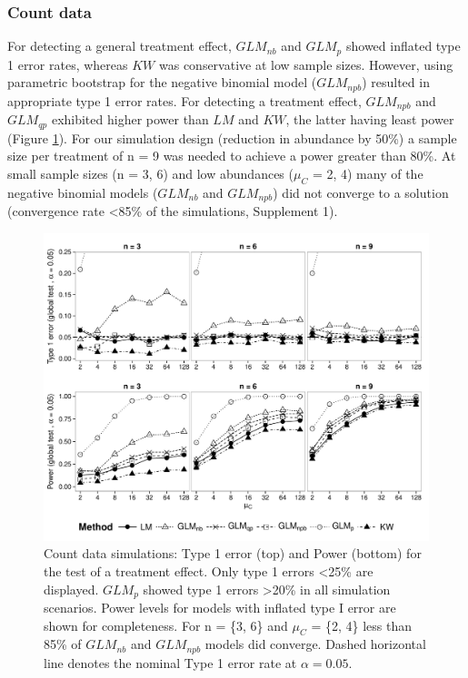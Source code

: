 \documentclass[twocolumn, natbib]{svjour3}
\begin{document}
\subsubsection{Count data}
For detecting a general treatment effect, $GLM_{nb}$ and $GLM_{p}$ showed inflated type 1 error rates, whereas $KW$ was conservative at low sample sizes.
However, using parametric bootstrap for the negative binomial model ($GLM_{npb}$) resulted in appropriate type 1 error rates.
For detecting a treatment effect, $GLM_{npb}$ and $GLM_{qp}$ exhibited higher power than $LM$ and $KW$, the latter having least power (Figure \ref{fig:p_glob_c}).
For our simulation design (reduction in abundance by 50\%) a sample size per treatment of n = 9 was needed to achieve a power greater than 80\%.
At small sample sizes (n = {3, 6}) and low abundances ($\mu_C$ = {2, 4}) many of the negative binomial models ($GLM_{nb}$ and $GLM_{npb}$) did not converge to a solution (convergence rate \textless 85\% of the simulations, Supplement 1). 

\begin{figure}
  \centering
  \includegraphics[width = 126mm]{p_glob_c.pdf}
  \caption{Count data simulations: Type 1 error (top) and Power (bottom) for the test of a treatment effect.
  Only type 1 errors \textless 25\% are displayed. 
  $GLM_p$ showed type 1 errors \textgreater 20\% in all simulation scenarios.
  Power levels for models with inflated type I error are shown for completeness.
  For n = \{3, 6\} and $\mu_C$ = \{2, 4\} less than 85\% of $GLM_{nb}$ and $GLM_{npb}$ models did converge.
  Dashed horizontal line denotes the nominal Type 1 error rate at $\alpha = 0.05$.
  }
  \label{fig:p_glob_c}
\end{figure}
\end{document}
